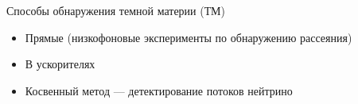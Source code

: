 Способы обнаружения темной материи (ТМ)
\begin{itemize}
	\item Прямые (низкофоновые эксперименты по обнаружению рассеяния)
	\item В ускорителях
	\item Косвенный метод --- детектирование потоков нейтрино
\end{itemize}